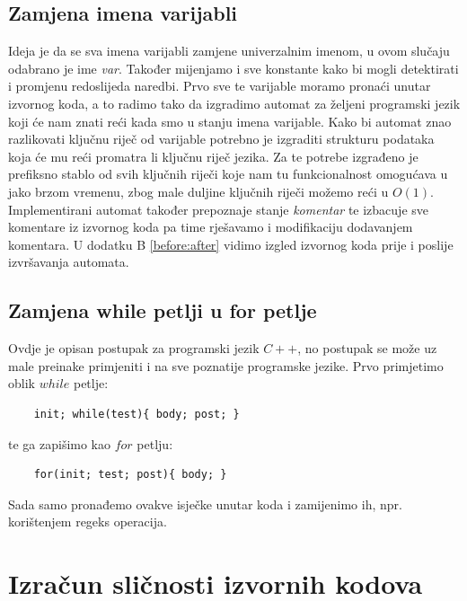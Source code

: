 \subsection{Zamjena imena varijabli}

Ideja je da se sva imena varijabli zamjene univerzalnim imenom, u ovom slučaju odabrano je ime \textit{var}. Također mijenjamo i sve konstante kako bi mogli detektirati i promjenu redoslijeda naredbi. Prvo sve te varijable moramo pronaći unutar izvornog koda, a to radimo tako da izgradimo automat za željeni programski jezik koji će nam znati reći kada smo u stanju imena varijable. Kako bi automat znao razlikovati ključnu riječ od varijable potrebno je izgraditi strukturu podataka koja će mu reći promatra li ključnu riječ jezika. Za te potrebe izgrađeno je prefiksno stablo \cite{prefix-tree} od svih ključnih riječi koje nam tu funkcionalnost omogućava u jako brzom vremenu, zbog male duljine ključnih riječi možemo reći u $O(1)$. Implementirani automat također prepoznaje stanje \textit{komentar} te izbacuje sve komentare iz izvornog koda pa time rješavamo i modifikaciju dodavanjem komentara. U dodatku B \ref{before:after} vidimo izgled izvornog koda prije i poslije izvršavanja automata. \newline


\subsection{Zamjena while petlji u for petlje}

Ovdje je opisan postupak za programski jezik $C++$, no postupak se može uz male preinake primjeniti i na sve poznatije programske jezike. Prvo primjetimo oblik $while$ petlje:
\begin{lstlisting}
	init; while(test){ body; post; }
\end{lstlisting}

\noindent te ga zapišimo kao $for$ petlju:
\begin{lstlisting}
	for(init; test; post){ body; }
\end{lstlisting}

\noindent Sada samo pronađemo ovakve isječke unutar koda i zamijenimo ih, npr. korištenjem regeks operacija.

\section{Izračun sličnosti izvornih kodova}

